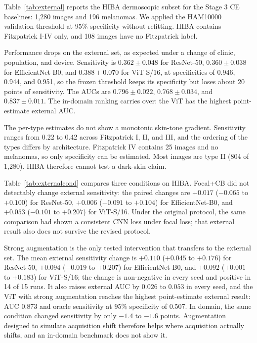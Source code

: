 Table~\ref{tab:external} reports the HIBA dermoscopic subset for the Stage 3 CE baselines: 1,280 images and 196 melanomas. We applied the HAM10000 validation threshold at 95\% specificity without refitting. HIBA contains Fitzpatrick I-IV only, and 108 images have no Fitzpatrick label.

Performance drops on the external set, as expected under a change of clinic, population, and device. Sensitivity is $0.362\pm0.048$ for ResNet-50, $0.360\pm0.038$ for EfficientNet-B0, and $0.388\pm0.070$ for ViT-S/16, at specificities of 0.946, 0.944, and 0.951, so the frozen threshold keeps its specificity but loses about 20 points of sensitivity. The AUCs are $0.796\pm0.022$, $0.768\pm0.034$, and $0.837\pm0.011$. The in-domain ranking carries over: the ViT has the highest point-estimate external AUC.

The per-type estimates do not show a monotonic skin-tone gradient. Sensitivity ranges from 0.22 to 0.42 across Fitzpatrick I, II, and III, and the ordering of the types differs by architecture. Fitzpatrick IV contains 25 images and no melanomas, so only specificity can be estimated. Most images are type II (804 of 1,280). HIBA therefore cannot test a dark-skin claim.

Table~\ref{tab:externalcond} compares three conditions on HIBA. Focal+CB did not detectably change external sensitivity: the paired changes are $+0.017$ ($-0.065$ to $+0.100$) for ResNet-50, $+0.006$ ($-0.091$ to $+0.104$) for EfficientNet-B0, and $+0.053$ ($-0.101$ to $+0.207$) for ViT-S/16. Under the original protocol, the same comparison had shown a consistent CNN loss under focal loss; that external result also does not survive the revised protocol.

Strong augmentation is the only tested intervention that transfers to the external set. The mean external sensitivity change is $+0.110$ ($+0.045$ to $+0.176$) for ResNet-50, $+0.094$ ($-0.019$ to $+0.207$) for EfficientNet-B0, and $+0.092$ ($+0.001$ to $+0.183$) for ViT-S/16; the change is non-negative in every seed and positive in 14 of 15 runs. It also raises external AUC by $0.026$ to $0.053$ in every seed, and the ViT with strong augmentation reaches the highest point-estimate external result: AUC 0.873 and oracle sensitivity at 95\% specificity of 0.507. In domain, the same condition changed sensitivity by only $-1.4$ to $-1.6$ points. Augmentation designed to simulate acquisition shift therefore helps where acquisition actually shifts, and an in-domain benchmark does not show it.



